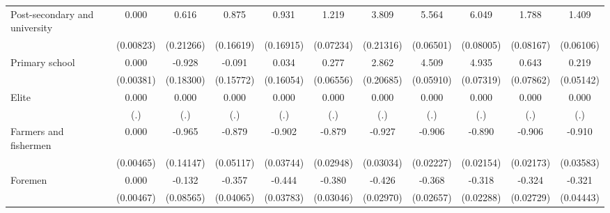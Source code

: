 {\begin{tabular}{l*{10}{c}}
Post-secondary and university&       0.000         &       0.616\sym{**} &       0.875\sym{***}&       0.931\sym{***}&       1.219\sym{***}&       3.809\sym{***}&       5.564\sym{***}&       6.049\sym{***}&       1.788\sym{***}&       1.409\sym{***}\\
                    &   (0.00823)         &   (0.21266)         &   (0.16619)         &   (0.16915)         &   (0.07234)         &   (0.21316)         &   (0.06501)         &   (0.08005)         &   (0.08167)         &   (0.06106)         \\
Primary school      &       0.000         &      -0.928\sym{***}&      -0.091         &       0.034         &       0.277\sym{***}&       2.862\sym{***}&       4.509\sym{***}&       4.935\sym{***}&       0.643\sym{***}&       0.219\sym{***}\\
                    &   (0.00381)         &   (0.18300)         &   (0.15772)         &   (0.16054)         &   (0.06556)         &   (0.20685)         &   (0.05910)         &   (0.07319)         &   (0.07862)         &   (0.05142)         \\
Elite               &       0.000         &       0.000         &       0.000         &       0.000         &       0.000         &       0.000         &       0.000         &       0.000         &       0.000         &       0.000         \\
                    &         (.)         &         (.)         &         (.)         &         (.)         &         (.)         &         (.)         &         (.)         &         (.)         &         (.)         &         (.)         \\
Farmers and fishermen&       0.000         &      -0.965\sym{***}&      -0.879\sym{***}&      -0.902\sym{***}&      -0.879\sym{***}&      -0.927\sym{***}&      -0.906\sym{***}&      -0.890\sym{***}&      -0.906\sym{***}&      -0.910\sym{***}\\
                    &   (0.00465)         &   (0.14147)         &   (0.05117)         &   (0.03744)         &   (0.02948)         &   (0.03034)         &   (0.02227)         &   (0.02154)         &   (0.02173)         &   (0.03583)         \\
Foremen             &       0.000         &      -0.132         &      -0.357\sym{***}&      -0.444\sym{***}&      -0.380\sym{***}&      -0.426\sym{***}&      -0.368\sym{***}&      -0.318\sym{***}&      -0.324\sym{***}&      -0.321\sym{***}\\
                    &   (0.00467)         &   (0.08565)         &   (0.04065)         &   (0.03783)         &   (0.03046)         &   (0.02970)         &   (0.02657)         &   (0.02288)         &   (0.02729)         &   (0.04443)         \\

\end{tabular}}
